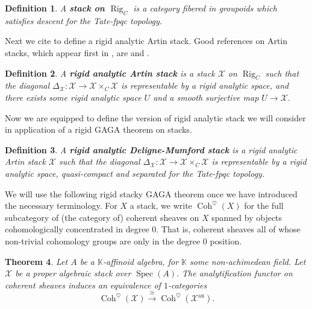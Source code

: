 \documentclass[11pt]{amsart}
\newtheorem{theorem}{Theorem}[section]
\newtheorem{definition}[theorem]{Definition}
\theoremstyle{definition}
\numberwithin{equation}{section}
\newcommand{\Spec}{\operatorname{Spec}} 	%
\newcommand{\sX}{\mathscr{X}}		%
\newcommand{\bbK}{\mathbb{K}}		%
\begin{document}
		\begin{definition}
			A \textbf{stack on $\operatorname{Rig}_C$} is a category fibered in groupoids which satisfies descent for the Tate-fpqc topology. 
		\end{definition}
		
		Next we cite \cite{Emerton-Gee-Hellman-categorical-p-adic-langlands} to define a rigid analytic Artin stack. Good references on Artin stacks, which appear first in \cite{Artin-versal-deformations-algebraic-stacks}, are  \cite{Abramovich-Olsson-Vistoli-tame-stacks-pos-characteristic} and \cite{Abramovich-Olsson-Vistoli-twisted-stable-maps-tame-Artin-stacks}.
		
		\begin{definition}\cite[$5.1.10$]{Emerton-Gee-Hellman-categorical-p-adic-langlands}
			A \textbf{rigid analytic Artin stack} is a stack $\sX$ on $\operatorname{Rig}_C$ such that the diagonal $\Delta_{\sX}:\sX\to \sX\times_C \sX$ is representable by a rigid analytic space, and there exists some rigid analytic space $U$ and a smooth surjective map $U\to \sX.$
		\end{definition}
		
		Now we are equipped to define the version of rigid analytic stack we will consider in application of a rigid GAGA theorem on stacks. 
		
		\begin{definition}
			\label{def: rigid analytic DM stack v2}
			A \textbf{rigid analytic Deligne-Mumford stack} is a rigid analytic Artin stack $\sX$ such that the diagonal $\Delta_{\sX}:\sX\to \sX\times_C\sX$ is representable by a rigid analytic space, quasi-compact and separated for the Tate-fpqc topology. 
		\end{definition}
		
		We will use the following rigid stacky GAGA theorem once we have introduced the necessary terminology. For $X$ a stack, we write $\operatorname{Coh}^{\heartsuit}(X)$ for the full subcategory of (the category of) coherent sheaves on $X$ spanned by objects cohomologically concentrated in degree $0.$ That is, coherent sheaves all of whose non-trivial cohomology groups are only in the degree $0$ position.
		
		\begin{theorem}\cite[Theorem $7.4$]{Porta-Yu-Higher-analytic-stacks-GAGA}\label{t: rigid stacky GAGA}
			Let $A$ be a $\bbK$-affinoid algebra, for $\bbK$ some non-achimedean field. Let $\sX$ be a proper algebraic stack over $\Spec(A).$ The analytification functor on coherent sheaves induces an equivalence of $1$-categories
			\[\operatorname{Coh}^{\heartsuit}(\sX)\overset{\cong}{\to} \operatorname{Coh}^{\heartsuit}(\sX^{\text{an}}).\] 
		\end{theorem}
		
\end{document}
